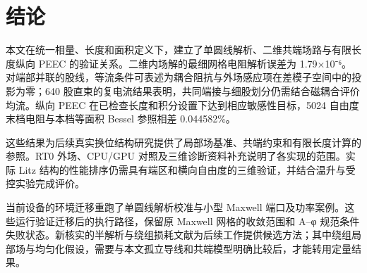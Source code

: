 \section{结论}
\label{chapter:05}

\hypertarget{05.conclusions.p1}{}
本文在统一相量、长度和面积定义下，建立了单圆线解析、二维共端场路与有限长度纵向 PEEC 的验证关系。二维内场解的最细网格电阻解析误差为 1.79×10⁻⁶。对端部并联的股线，等流条件可表述为耦合阻抗与外场感应项在差模子空间中的投影为零；640 股直束的复电流结果表明，共同端接与细股划分仍需结合磁耦合评价均流。纵向 PEEC 在已检查长度和积分设置下达到相应敏感性目标，5024 自由度末档电阻与本档等面积 Bessel 参照相差 0.044582\%。

\hypertarget{05.conclusions.p2}{}
这些结果为后续真实换位结构研究提供了局部场基准、共端约束和有限长度计算的参照。RT0 外场、CPU/GPU 对照及三维诊断资料补充说明了各实现的范围。实际 Litz 结构的性能排序仍需具有端区和横向自由度的三维验证，并结合温升与受控实验完成评价。

\hypertarget{05.current.evidence}{}
当前设备的环境迁移重跑了单圆线解析校准与小型 Maxwell 端口及功率案例。这些运行验证迁移后的执行路径，保留原 Maxwell 网格的收敛范围和 A–φ 规范条件失败状态。新核实的半解析与绕组损耗文献为后续工作提供候选方法；其中绕组局部场与均匀化假设，需要与本文孤立导线和共端模型明确比较后，才能转用定量结果。\cite{C01,ZHU2026}
